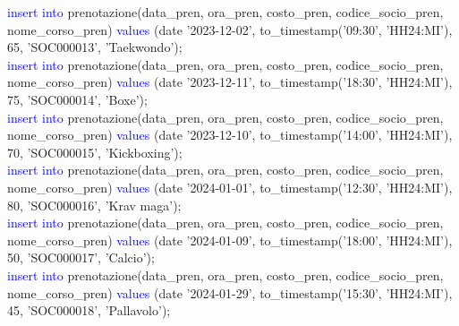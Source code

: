 \documentclass{article}
\begin{document}
\begin{flushleft}
{        \hspace*{0.5em}\textcolor{blue}{insert into} prenotazione(data\_pren, ora\_pren, costo\_pren, codice\_socio\_pren, \hspace*{0.5em}nome\_corso\_pren) \textcolor{blue}{values} (date '2023-12-02', to\_timestamp('09:30', 'HH24:MI'), 65, \hspace*{0.5em}'SOC000013', 'Taekwondo'); \\
        \vspace{2mm}
        \hspace*{0.5em}\textcolor{blue}{insert into} prenotazione(data\_pren, ora\_pren, costo\_pren, codice\_socio\_pren, \hspace*{0.5em}nome\_corso\_pren) \textcolor{blue}{values} (date '2023-12-11', to\_timestamp('18:30', 'HH24:MI'), 75, \hspace*{0.5em}'SOC000014', 'Boxe'); \\
        \vspace{2mm}
        \hspace*{0.5em}\textcolor{blue}{insert into} prenotazione(data\_pren, ora\_pren, costo\_pren, codice\_socio\_pren, \hspace*{0.5em}nome\_corso\_pren) \textcolor{blue}{values} (date '2023-12-10', to\_timestamp('14:00', 'HH24:MI'), 70, \hspace*{0.5em}'SOC000015', 'Kickboxing'); \\
        \vspace{2mm}
        \hspace*{0.5em}\textcolor{blue}{insert into} prenotazione(data\_pren, ora\_pren, costo\_pren, codice\_socio\_pren, \hspace*{0.5em}nome\_corso\_pren) \textcolor{blue}{values} (date '2024-01-01', to\_timestamp('12:30', 'HH24:MI'), 80, \hspace*{0.5em}'SOC000016', 'Krav maga'); \\
        \vspace{2mm}
        \hspace*{0.5em}\textcolor{blue}{insert into} prenotazione(data\_pren, ora\_pren, costo\_pren, codice\_socio\_pren, \hspace*{0.5em}nome\_corso\_pren) \textcolor{blue}{values} (date '2024-01-09', to\_timestamp('18:00', 'HH24:MI'), 50, \hspace*{0.5em}'SOC000017', 'Calcio'); \\
        \vspace{2mm}
        \hspace*{0.5em}\textcolor{blue}{insert into} prenotazione(data\_pren, ora\_pren, costo\_pren, codice\_socio\_pren, \hspace*{0.5em}nome\_corso\_pren) \textcolor{blue}{values} (date '2024-01-29', to\_timestamp('15:30', 'HH24:MI'), 45, \hspace*{0.5em}'SOC000018', 'Pallavolo'); \\
}
\end{flushleft}
\end{document}
